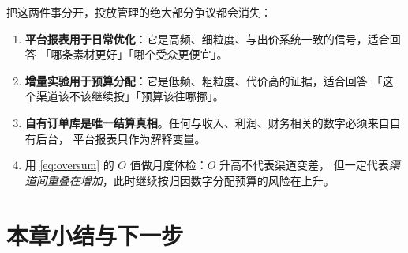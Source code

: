 \begin{keypoint}
把这两件事分开，投放管理的绝大部分争议都会消失：
\begin{enumerate}
  \item \textbf{平台报表用于日常优化}：它是高频、细粒度、与出价系统一致的信号，适合回答
        「哪条素材更好」「哪个受众更便宜」。
  \item \textbf{增量实验用于预算分配}：它是低频、粗粒度、代价高的证据，适合回答
        「这个渠道该不该继续投」「预算该往哪挪」。
  \item \textbf{自有订单库是唯一结算真相}。任何与收入、利润、财务相关的数字必须来自自有后台，
        平台报表只作为解释变量。
  \item 用 \cref{eq:oversum} 的 $O$ 值做月度体检：$O$ 升高不代表渠道变差，
        但一定代表\emph{渠道间重叠在增加}，此时继续按归因数字分配预算的风险在上升。
\end{enumerate}
\end{keypoint}

\section{本章小结与下一步}

